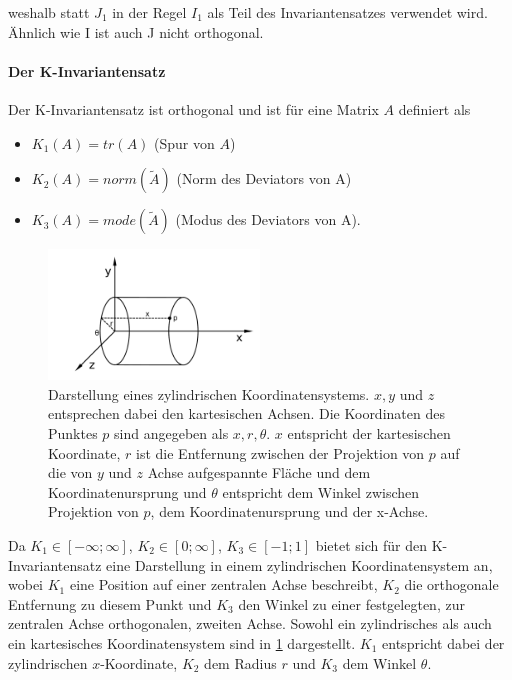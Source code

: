 \documentclass[a4paper,fontsize=12pt,toc=bib,halfparskip,ngerman]{scrartcl}
\begin{document}
weshalb statt $J_1$ in der Regel $I_1$ als Teil des Invariantensatzes verwendet wird. \"Ahnlich wie I ist auch J nicht orthogonal.

\paragraph{Der K-Invariantensatz}
Der K-Invariantensatz ist orthogonal und ist f\"ur eine Matrix $A$ definiert als

\begin{itemize}
	\item $K_1(A)=tr(A)$ (Spur von $A$)
	\item $K_2(A)=norm(\tilde{A})$ (Norm des Deviators von A)
	\item $K_3(A)=mode(\tilde{A})$ (Modus des Deviators von A).
\end{itemize}


\begin{figure}
	\centering
	\includegraphics[width=0.5\textwidth]{pictures/cylinder}
	\caption{Darstellung eines zylindrischen Koordinatensystems. $x,y$ und $z$ entsprechen dabei den kartesischen Achsen. Die Koordinaten des Punktes $p$ sind angegeben als $x, r, \theta$. $x$ entspricht der kartesischen Koordinate, $r$ ist die Entfernung zwischen der Projektion von $p$ auf die von $y$ und $z$ Achse aufgespannte Fl\"ache und dem Koordinatenursprung und $\theta$ entspricht dem Winkel zwischen Projektion von $p$, dem Koordinatenursprung und der x-Achse. }
	\label{cylinderCoords}
\end{figure}

Da $K_1 \in [-\infty; \infty]$, $K_2 \in [0;\infty]$, $K_3 \in [-1;1]$ bietet sich f\"ur den K-Invariantensatz eine Darstellung in einem zylindrischen Koordinatensystem an, wobei $K_1$ eine Position auf einer zentralen Achse beschreibt, $K_2$ die orthogonale Entfernung zu diesem Punkt und $K_3$ den Winkel zu einer festgelegten, zur zentralen Achse orthogonalen, zweiten Achse. Sowohl ein zylindrisches als auch ein kartesisches Koordinatensystem sind in \cref{cylinderCoords} dargestellt. $K_1$ entspricht dabei der zylindrischen $x$-Koordinate, $K_2$ dem Radius $r$ und $K_3$ dem Winkel $\theta$.
\end{document}
